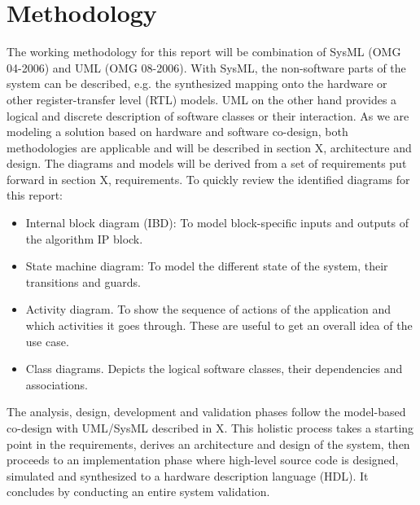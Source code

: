 \section{Methodology}

The working methodology for this report will be combination of SysML (OMG 04-2006) and UML (OMG 08-2006). With SysML, the non-software parts of the system can be described, e.g. the synthesized mapping onto the hardware or other register-transfer level (RTL) models. UML on the other hand provides a logical and discrete description of software classes or their interaction. As we are modeling a solution based on hardware and software co-design, both methodologies are applicable and will be described in section X, architecture and design. The diagrams and models will be derived from a set of requirements put forward in section X, requirements. To quickly review the identified diagrams for this report:

\begin{itemize}
	\item Internal block diagram (IBD): To model block-specific inputs and outputs of the algorithm IP block.
	\item State machine diagram: To model the different state of the system, their transitions and guards.
	\item Activity diagram. To show the sequence of actions of the application and which activities it goes through. These are useful to get an overall idea of the use case.
	\item Class diagrams. Depicts the logical software classes, their dependencies and associations.
\end{itemize}

The analysis, design, development and validation phases follow the model-based co-design with UML/SysML described in X. This holistic process takes a starting point in the requirements, derives an architecture and design of the system, then proceeds to an implementation phase where high-level source code is designed, simulated and synthesized to a hardware description language (HDL). It concludes by conducting an entire system validation.
